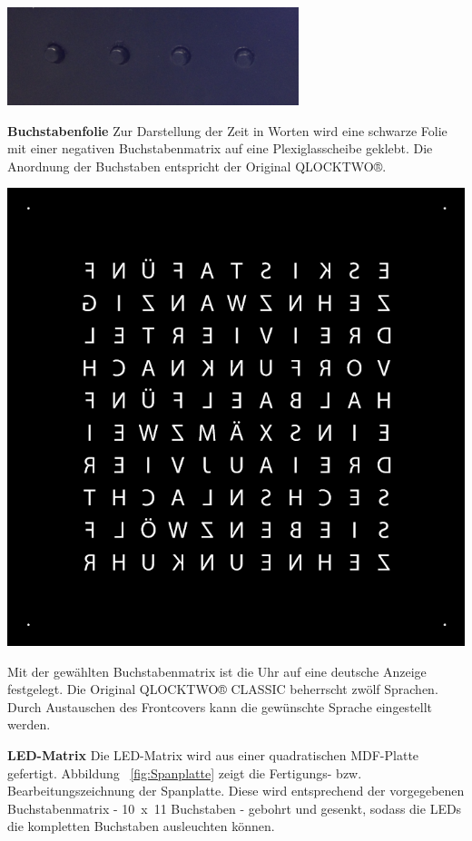 \begin{multicols}{2}
{}

{
\centering
\includegraphics[width=0.6\columnwidth]{Abbildungen/Konstruktion/Taster03}

}



\textbf{Buchstabenfolie} Zur Darstellung der Zeit in Worten wird eine schwarze Folie mit einer negativen Buchstabenmatrix auf eine Plexiglasscheibe geklebt. Die Anordnung der Buchstaben entspricht der Original QLOCKTWO®.

{
\centering
\includegraphics[width=0.75\columnwidth]{Abbildungen/Konstruktion/Buchstaben}

}
Mit der gewählten Buchstabenmatrix ist die Uhr auf eine deutsche Anzeige festgelegt. Die Original QLOCKTWO® CLASSIC beherrscht zwölf Sprachen. Durch Austauschen des Frontcovers kann die gewünschte Sprache eingestellt werden.

\textbf{LED-Matrix} Die LED-Matrix wird aus einer quadratischen MDF-Platte gefertigt. Abbildung ~\ref{fig:Spanplatte} zeigt die Fertigungs- bzw. Bearbeitungszeichnung der Spanplatte. Diese wird entsprechend der vorgegebenen Buchstabenmatrix -  10~x~11 Buchstaben - gebohrt und gesenkt, sodass die LEDs die kompletten Buchstaben ausleuchten können.


\end{multicols}
